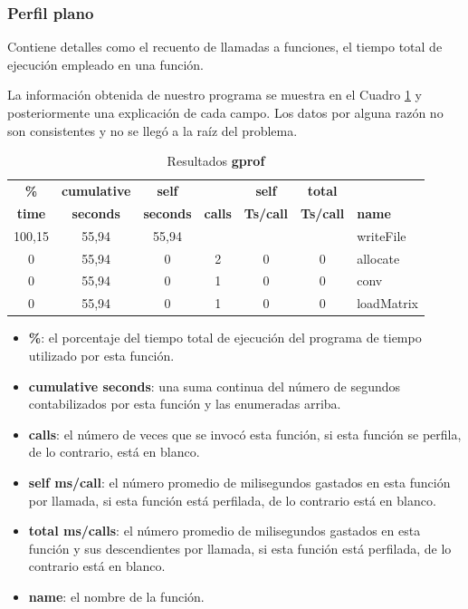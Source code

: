\documentclass[a4paper]{article}
\begin{document}
\subsubsection{Perfil plano}
Contiene detalles como el recuento de llamadas a funciones, el tiempo total de ejecución empleado en una función.

La información obtenida de nuestro programa se muestra en el Cuadro \ref{tab:tablegrof} y posteriormente una explicación de cada campo. Los datos por alguna razón no son consistentes y no se llegó a la raíz del problema.

\begin{table}[H]
\centering
\begin{tabular}{cccccc|l}
\textbf{\%}     & \textbf{cumulative} & \textbf{self}    &       & \textbf{self}    & \textbf{total}   &            \\ 
\textbf{time}   & \textbf{seconds}    & \textbf{seconds} & \textbf{calls} & \textbf{Ts/call} & \textbf{Ts/call} & \textbf{name}       \\ \hline
100,15 & 55,94      & 55,94   &       &         &         & writeFile  \\
0      & 55,94      & 0       & 2     & 0       & 0       & allocate   \\
0      & 55,94      & 0       & 1     & 0       & 0       & conv       \\
0      & 55,94      & 0       & 1     & 0       & 0       & loadMatrix
\end{tabular}
\caption{Resultados \textbf{gprof}}
\label{tab:tablegrof}
\end{table}

\begin{itemize}
\item \textbf{\%}: el porcentaje del tiempo total de ejecución del programa de tiempo utilizado por esta función.
\item \textbf{cumulative seconds}: una suma continua del número de segundos contabilizados por esta función y las enumeradas arriba.
\item \textbf{calls}: el número de veces que se invocó esta función, si esta función se perfila, de lo contrario, está en blanco.
\item \textbf{self ms/call}: el número promedio de milisegundos gastados en esta función por llamada, si esta función está perfilada, de lo contrario está en blanco.
\item \textbf{total ms/calls}: 
el número promedio de milisegundos gastados en esta función y sus descendientes por llamada, si esta función está perfilada, de lo contrario está en blanco.
\item \textbf{name}: el nombre de la función.

\end{itemize}
\end{document}

